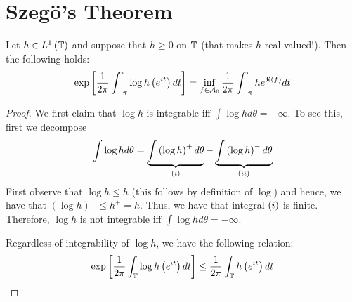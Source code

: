 \section{Szegö's Theorem}
\begin{theorem}[Szegö]
    Let $h \in L^{1} \left( \mathbb T \right)$ and suppose that $h \ge 0$ on $\mathbb T$ (that makes $h$ real valued!). Then the following holds:
    \begin{align*}
	\exp \left[ \frac{1}{2\pi} \int_{-\pi}^{\pi} \log h\left( e^{it} \right) dt \right] = \inf_{f\in {\cal A}_{0}} \frac{1}{2\pi} \int_{-\pi}^{\pi} he^{\Re \left( f \right)}dt
    \end{align*}
    \label{thm:prelude-to-szego-kolmorogoff-krein}
\end{theorem}
\begin{proof}
    We first claim that $\log h$ is integrable iff $\int \log h d\theta = -\infty$. To see this, first we decompose 
    \begin{align*}
	\int \log h d\theta = \underbrace{\int \left( \log h \right)^{+} d\theta}_{(\romannumeral1)} - \underbrace{\int \left( \log h \right)^{-} d\theta}_{(\romannumeral2)}
    \end{align*}
First observe that $\log h \le h$ (this follows by definition of $\log$) and hence, we have that $\left( \log h \right)^{+} \le h^{+}=h$. Thus, we have that integral $\left( \romannumeral1 \right)$ is finite. Therefore, $\log h$ is not integrable iff $\int \log h d\theta =- \infty$. 

    Regardless of integrability of $\log h$, we have the following relation:
    \begin{equation}
	\exp \left[ \frac{1}{2\pi} \int_{\mathbb T} \log h\left( e^{it} \right) dt \right] \le \frac{1}{2\pi} \int_{\mathbb T} h\left( e^{it} \right) dt
	\label{eqn:almost-am-gm}
    \end{equation}


\end{proof}
